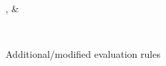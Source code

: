 \begin{figure}
\flushleft{}
\begin{salign}
   \rho, \delta
   &
\end{salign}
\\[5mm]
\flushleft {}
\begin{smathpar}
   {
   }
\end{smathpar}
\caption{Additional/modified evaluation rules}
\end{figure}
